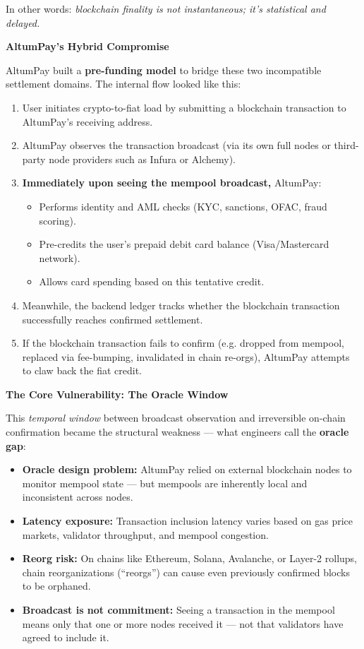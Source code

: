 In other words: \emph{blockchain finality is not instantaneous; it’s statistical and delayed.}

\bigskip

\textbf{AltumPay’s Hybrid Compromise}

AltumPay built a \textbf{pre-funding model} to bridge these two incompatible settlement domains. The internal flow looked like this:

\begin{enumerate}
  \item User initiates crypto-to-fiat load by submitting a blockchain transaction to AltumPay’s receiving address.
  \item AltumPay observes the transaction broadcast (via its own full nodes or third-party node providers such as Infura or Alchemy).
  \item \textbf{Immediately upon seeing the mempool broadcast,} AltumPay:
    \begin{itemize}
      \item Performs identity and AML checks (KYC, sanctions, OFAC, fraud scoring).
      \item Pre-credits the user’s prepaid debit card balance (Visa/Mastercard network).
      \item Allows card spending based on this tentative credit.
    \end{itemize}
  \item Meanwhile, the backend ledger tracks whether the blockchain transaction successfully reaches confirmed settlement.
  \item If the blockchain transaction fails to confirm (e.g. dropped from mempool, replaced via fee-bumping, invalidated in chain re-orgs), AltumPay attempts to claw back the fiat credit.
\end{enumerate}

\bigskip

\textbf{The Core Vulnerability: The Oracle Window}

This \emph{temporal window} between broadcast observation and irreversible on-chain confirmation became the structural weakness — what engineers call the \textbf{oracle gap}:

\begin{itemize}
  \item \textbf{Oracle design problem:} AltumPay relied on external blockchain nodes to monitor mempool state — but mempools are inherently local and inconsistent across nodes.
  \item \textbf{Latency exposure:} Transaction inclusion latency varies based on gas price markets, validator throughput, and mempool congestion.
  \item \textbf{Reorg risk:} On chains like Ethereum, Solana, Avalanche, or Layer-2 rollups, chain reorganizations (``reorgs'') can cause even previously confirmed blocks to be orphaned.
  \item \textbf{Broadcast is not commitment:} Seeing a transaction in the mempool means only that one or more nodes received it — not that validators have agreed to include it.
\end{itemize}

